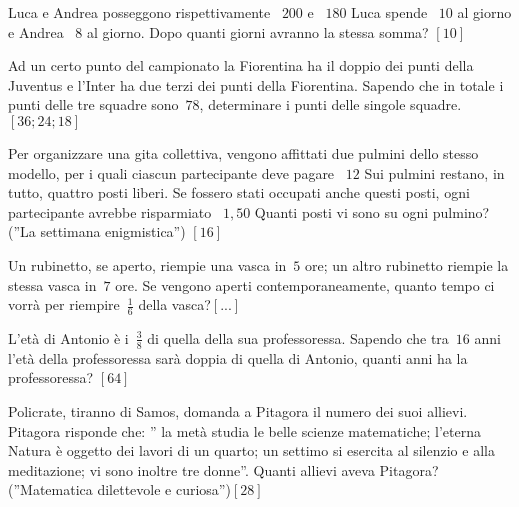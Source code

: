 \begin{multicols}{2}
\begin{esercizio}[\Ast]
\label{ese:14.39}
Luca e Andrea posseggono rispettivamente \officialeuro~$200$ e 
\officialeuro~$180$ Luca spende \officialeuro~$10$ al giorno e Andrea 
\officialeuro~$8$ al giorno. Dopo quanti giorni avranno la stessa somma? 
\hfill $\left[10\right]$
\end{esercizio}

\begin{esercizio}[\Ast]
\label{ese:14.40}
Ad un certo punto del campionato la Fiorentina ha il doppio dei punti della 
Juventus e l'Inter ha due terzi dei punti della Fiorentina. Sapendo che in 
totale i punti delle tre squadre sono~$78$, determinare i punti delle singole 
squadre. \hfill $\left[36; 24; 18\right]$
\end{esercizio}

\begin{esercizio}[\Ast]
\label{ese:14.41}
Per organizzare una gita collettiva, vengono affittati due pulmini dello stesso 
modello, per i quali ciascun partecipante deve pagare \officialeuro~$12$ Sui 
pulmini restano, in tutto, quattro posti liberi. Se fossero stati occupati 
anche 
questi posti, ogni partecipante avrebbe risparmiato \officialeuro~$1,50$ Quanti 
posti vi sono su ogni pulmino? (''La settimana enigmistica'') 
\hfill $\left[16\right]$
\end{esercizio}

\begin{esercizio}
\label{ese:14.42}
Un rubinetto, se aperto, riempie una vasca in~$5$ ore; un altro rubinetto 
riempie la stessa vasca in~$7$ ore. Se vengono aperti contemporaneamente, 
quanto 
tempo ci vorrà per riempire~$\frac{1}{6}$ della vasca?\hfill $\left[...\right]$
\end{esercizio}

\begin{esercizio}[\Ast]
\label{ese:14.43}
L'età di Antonio è i~$\frac{3}{8}$ di quella della sua professoressa. Sapendo 
che tra~$16$ anni l'età della professoressa sarà doppia di quella di Antonio, 
quanti anni ha la professoressa? \hfill $\left[64\right]$
\end{esercizio}

\begin{esercizio}[\Ast]
\label{ese:14.44}
Policrate, tiranno di Samos, domanda a Pitagora il numero dei suoi allievi. 
Pitagora risponde che: '' la metà studia le belle scienze matematiche; l'eterna 
Natura è oggetto dei lavori di un quarto; un settimo si esercita al silenzio e 
alla meditazione; vi sono inoltre tre donne''. Quanti allievi aveva Pitagora? 
(''Matematica dilettevole e curiosa'')\hfill $\left[28\right]$
\end{esercizio}


\end{multicols}
